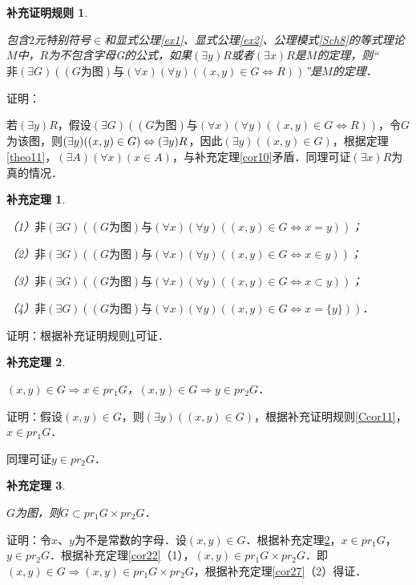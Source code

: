 \documentclass[12pt, a4paper, oneside]{book}
\newtheorem{Ccor}{补充证明规则}
\newtheorem{cor}{补充定理}
\begin{document}
			\begin{Ccor}\label{Ccor21}
				\hfill\par
				包含$2$元特别符号$\in$和显式公理\ref{ex1}、显式公理\ref{ex2}、公理模式\ref{Sch8}的等式理论$M$中，$R$为不包含字母G的公式，如果$(\exists y)R$或者$(\exists x)R$是$M$的定理，则“$\text{非}(\exists G)((G\text{为图})\text{与}(\forall x)(\forall y)((x, y)\in G\Leftrightarrow R))$”是$M$的定理．
			\end{Ccor}
			证明：
			\par
			若$(\exists y)R$，假设$(\exists G)((G\text{为图})\text{与}(\forall x)(\forall y)((x, y)\in G\Leftrightarrow R))$，令$G$为该图，则$(\exists y)\\((x, y)\in G)\Leftrightarrow (\exists y)R$，因此$(\exists y)((x, y)\in G)$，根据定理\ref{theo11}，$(\exists A)(\forall x)(x\in A)$，与补充定理\ref{cor10}矛盾．同理可证$(\exists x)R$为真的情况．

			\begin{cor}\label{cor28}
				\hfill\par				
				（1）$\text{非}(\exists G)((G\text{为图})\text{与}(\forall x)(\forall y)((x, y)\in G\Leftrightarrow x=y))$；
				\par
				（2）$\text{非}(\exists G)((G\text{为图})\text{与}(\forall x)(\forall y)((x, y)\in G\Leftrightarrow x\in y))$；
				\par
				（3）$\text{非}(\exists G)((G\text{为图})\text{与}(\forall x)(\forall y)((x, y)\in G\Leftrightarrow x\subset y))$；
				\par
				（4）$\text{非}(\exists G)((G\text{为图})\text{与}(\forall x)(\forall y)((x, y)\in G\Leftrightarrow x=\{y\}))$．
			\end{cor}
			证明：根据补充证明规则\ref{Ccor21}可证．

			\begin{cor}\label{cor29}
				\hfill\par
				$(x, y)\in G\Rightarrow x\in pr_1G$，$(x, y)\in G\Rightarrow y\in pr_2G$．
			\end{cor}
			证明：假设$(x, y)\in G$，则$(\exists y)((x, y)\in G)$，根据补充证明规则\ref{Ccor11}，$x\in pr_1G$．
			\par
			同理可证$y\in pr_2G$．

			\begin{cor}\label{cor30}
				\hfill\par
				$G$为图，则$G\subset pr_1G\times pr_2G$．
			\end{cor}
			证明：令$x$、$y$为不是常数的字母．设$(x, y)\in G$．根据补充定理\ref{cor29}，$x\in pr_1G$，$y\in pr_2G$．根据补充定理\ref{cor22}（1），$(x, y)\in pr_1G\times pr_2G$．即$(x, y)\in G\Rightarrow (x, y)\in pr_1G\times pr_2G$，根据补充定理\ref{cor27}（2）得证．				
\end{document}
